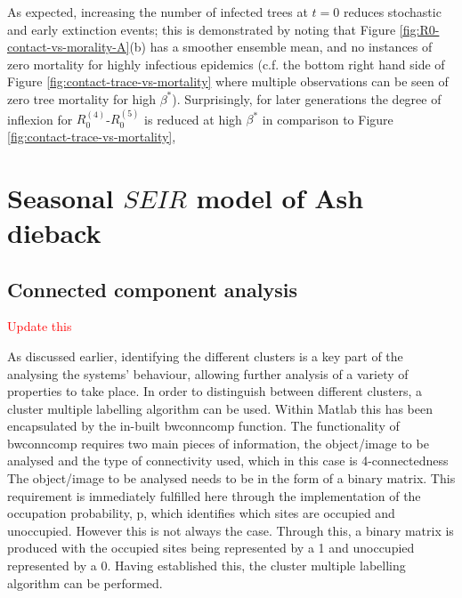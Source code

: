 As expected, increasing the number of infected trees at $t=0$ reduces stochastic and early extinction events;
this is demonstrated by noting that Figure \ref{fig:R0-contact-vs-morality-A}(b) has a smoother ensemble mean, and no instances of zero mortality for highly infectious epidemics (c.f. the bottom right hand side of Figure \ref{fig:contact-trace-vs-mortality} where multiple observations can be seen of zero tree mortality for high $\beta^*$).
Surprisingly, for later generations the degree of inflexion for $R_0^{(4)}$-$R_0^{(5)}$ is reduced at high $\beta^*$ in comparison to Figure \ref{fig:contact-trace-vs-mortality},

\newpage


\chapter{Seasonal $SEIR$ model of Ash dieback}

\label{section:ga-SEIR-variant}

\section{Connected component analysis}
\label{a:CCA}
\textcolor{red}{Update this}

As discussed earlier, identifying the different clusters is a key part of the analysing the systems’ behaviour, 
allowing further analysis of a variety of properties to take place. 
In order to distinguish between different clusters, a cluster multiple labelling algorithm can be used. 
Within Matlab this has been encapsulated by the in-built bwconncomp function. 
The functionality of bwconncomp requires two main pieces of information, the object/image to be analysed and the type of connectivity used, which in this case is 4-connectedness
The object/image to be analysed needs to be in the form of a binary matrix. 
This requirement is immediately fulfilled here through the implementation of the occupation probability, p, which identifies which sites are occupied and unoccupied.
However this is not always the case. 
Through this, a binary matrix is produced with the occupied sites being represented by a 1 and unoccupied represented by a 0. 
Having established this, the cluster multiple labelling algorithm can be performed.

